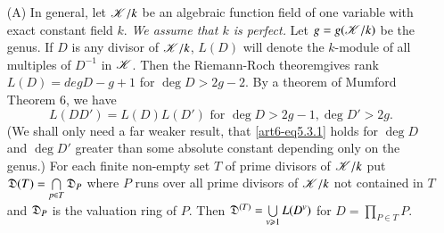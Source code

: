 \begin{itemize}
\item[(A)] In general, let $\mathscr{K}/k$ be an algebraic function field of one variable with exact constant field $k$. \textit{We assume that $k$ is perfect.} Let $g = g (\mathscr{K}/k)$ be the genus. If $D$ is any divisor of $\mathscr{K}/k$, $L(D)$ will denote the $k$-module of all multiples of $D^{-1}$ in $\mathscr{K}$. Then the Riemann-Roch theorem\pageoriginale gives rank $L(D) = deg D - g + 1$ for $\deg D > 2 g -2$. By a theorem of Mumford \cite{art6-key13} Theorem 6, we have
\setcounter{equation}{0}
\begin{equation}
L(DD') = L (D) L (D') \text{ for } \deg D > 2 g - 1, \deg D' > 2g. 
\label{art6-eq5.3.1}
\end{equation}
(We shall only need a far weaker result, that \eqref{art6-eq5.3.1} holds for $\deg D$ and $\deg D'$ greater than some absolute constant depending only on the genus.) For each finite non-empty set $T$ of prime divisors of $\mathscr{K}/k$ put $\mathfrak{D} (T) = \bigcap\limits_{p \in T} \mathfrak{D}_P$ where $P$ runs over all prime divisors of $\mathscr{K}/ k$ not contained in $T$ and $\mathfrak{D}_P$ is the valuation ring of $P$. Then $\mathfrak{D}^{(T)} = \bigcup\limits_{v \geqslant 1} L (D^v)$ for $D = \prod\limits_{P \in T} P$. 


\end{itemize}
